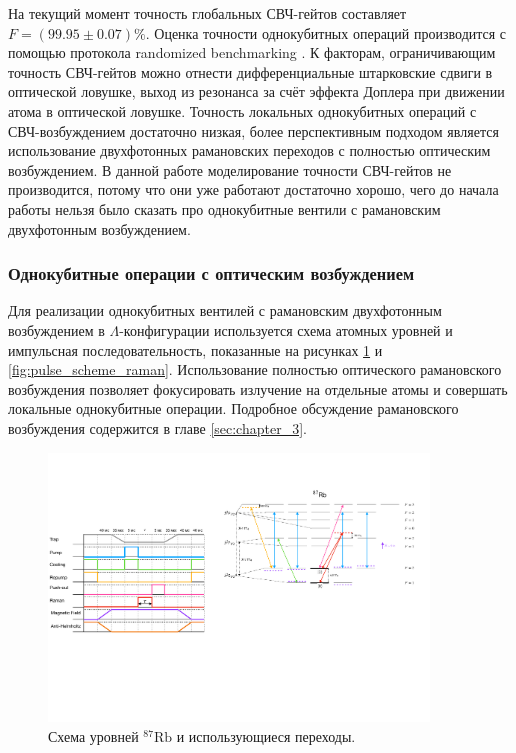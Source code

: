 На текущий момент точность глобальных СВЧ-гейтов составляет $F=(99.95 \pm 0.07)\%$. Оценка точности однокубитных операций производится с помощью протокола randomized benchmarking \cite{Hines_2023,Proctor:2022aa}. К факторам, ограничивающим точность СВЧ-гейтов можно отнести дифференциальные штарковские сдвиги в оптической ловушке, выход из резонанса за счёт эффекта Доплера при движении атома в оптической ловушке. Точность локальных однокубитных операций с СВЧ-возбуждением достаточно низкая, более перспективным подходом является использование двухфотонных рамановских переходов с полностью оптическим возбуждением. 
В данной работе моделирование точности СВЧ-гейтов не производится, потому что они уже работают достаточно хорошо, чего до начала работы нельзя было сказать про однокубитные вентили с рамановским двухфотонным возбуждением. 

\subsubsection{Однокубитные операции с оптическим возбуждением}

Для реализации однокубитных вентилей с рамановским двухфотонным возбуждением в $\Lambda$-конфигурации используется схема атомных уровней и импульсная последовательность, показанные на рисунках \ref{fig:atom_scheme_raman} и \ref{fig:pulse_scheme_raman}. Использование полностью оптического рамановского возбуждения позволяет фокусировать излучение на отдельные атомы и совершать локальные однокубитные операции. Подробное обсуждение рамановского возбуждения содержится в главе \ref{sec:chapter_3}.

\begin{figure}[H]
	\centering
	\includegraphics[width=0.9\textwidth]{images/atom_scheme_raman.pdf}
	\caption{Схема уровней $^{87}\text{Rb}$ и использующиеся переходы.}
	\label{fig:atom_scheme_raman}
\end{figure}

